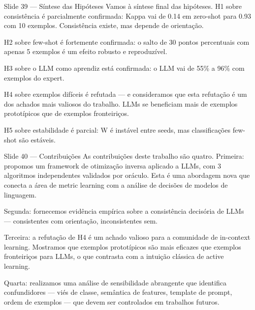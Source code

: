 \documentclass[aspectratio=169,11pt]{beamer}
\begin{document}
\begin{frame}{Slide 39 --- Síntese das Hipóteses}
\small
Vamos à síntese final das hipóteses. H1 sobre consistência é parcialmente confirmada: Kappa vai de 0.14 em zero-shot para 0.93 com 10 exemplos. Consistência existe, mas depende de orientação.

H2 sobre few-shot é fortemente confirmada: o salto de 30 pontos percentuais com apenas 5 exemplos é um efeito robusto e reproduzível.

H3 sobre o LLM como aprendiz está confirmada: o LLM vai de 55\% a 96\% com exemplos do expert.

H4 sobre exemplos difíceis é refutada --- e consideramos que esta refutação é um dos achados mais valiosos do trabalho. LLMs se beneficiam mais de exemplos prototípicos que de exemplos fronteiriços.

H5 sobre estabilidade é parcial: W é instável entre seeds, mas classificações few-shot são estáveis.
\end{frame}

\begin{frame}{Slide 40 --- Contribuições}
\small
As contribuições deste trabalho são quatro. Primeira: propomos um framework de otimização inversa aplicado a LLMs, com 3 algoritmos independentes validados por oráculo. Esta é uma abordagem nova que conecta a área de metric learning com a análise de decisões de modelos de linguagem.

Segunda: fornecemos evidência empírica sobre a consistência decisória de LLMs --- consistentes com orientação, inconsistentes sem.

Terceira: a refutação de H4 é um achado valioso para a comunidade de in-context learning. Mostramos que exemplos prototípicos são mais eficazes que exemplos fronteiriços para LLMs, o que contrasta com a intuição clássica de active learning.

Quarta: realizamos uma análise de sensibilidade abrangente que identifica confundidores --- viés de classe, semântica de features, template de prompt, ordem de exemplos --- que devem ser controlados em trabalhos futuros.
\end{frame}
\end{document}
